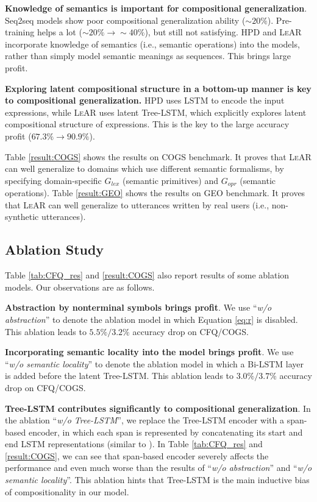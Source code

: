 \documentclass[11pt,a4paper]{article}
\begin{document}
\noindent \textbf{Knowledge of semantics is important for compositional generalization}.
Seq2seq models show poor compositional generalization ability ($\sim20\%$).
Pre-training helps a lot ($\sim20\% \to \sim40\%$), but still not satisfying.
\textsc{HPD} and \textsc{LeAR} incorporate knowledge of semantics (i.e., semantic operations) into the models, rather than simply model semantic meanings as sequences.
This brings large profit.

\noindent \textbf{Exploring latent compositional structure in a bottom-up manner is key to compositional generalization.}
\textsc{HPD} uses LSTM to encode the input expressions, while \textsc{LeAR} uses latent Tree-LSTM, which explicitly explores latent compositional structure of expressions.
This is the key to the large accuracy profit ($67.3\%\to 90.9\%$).

Table \ref{result:COGS} shows the results on COGS benchmark.
It proves that \textsc{LeAR} can well generalize to domains which use different semantic formalisms, by specifying domain-specific $G_{lex}$ (semantic primitives) and $G_{opr}$ (semantic operations).
Table \ref{result:GEO} shows the results on GEO benchmark.
It proves that \textsc{LeAR} can well generalize to utterances written by real users (i.e., non-synthetic utterances).


\subsection{Ablation Study}
\label{section:ablation}

Table \ref{tab:CFQ_res} and \ref{result:COGS} also report results of some ablation models.
Our observations are as follows.

\noindent \textbf{Abstraction by nonterminal symbols brings profit}.
We use ``\textit{w/o abstraction}'' to denote the ablation model in which Equation \ref{eq:r} is disabled.
This ablation leads to $5.5\%/3.2\%$ accuracy drop on CFQ/COGS.

\noindent \textbf{Incorporating semantic locality into the model brings profit}.
We use ``\textit{w/o semantic locality}'' to denote the ablation model in which a Bi-LSTM layer is added before the latent Tree-LSTM.
This ablation leads to $3.0\%/3.7\%$ accuracy drop on CFQ/COGS.

\noindent \textbf{Tree-LSTM contributes significantly to compositional generalization}. 
In the ablation ``\emph{w/o Tree-LSTM}'', we replace the Tree-LSTM encoder with a span-based encoder, in which each span is represented by concatenating its start and end LSTM representations (similar to \citet{herzig2020span-csp}).
In Table \ref{tab:CFQ_res} and \ref{result:COGS}, we can see that span-based encoder severely affects the performance and even much worse than the results of ``\textit{w/o abstraction}'' and ``\textit{w/o semantic locality}''.
This ablation hints that Tree-LSTM is the main inductive bias of compositionality in our model.
\end{document}

